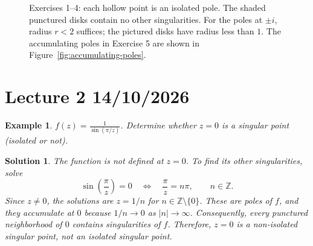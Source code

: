 \documentclass{report}
\newtheorem{example}{Example}
\newtheorem{solution}{Solution}
\begin{document}
\begin{figure}[H]
    \centering
    \caption{Exercises 1--4: each hollow point is an isolated pole. The shaded punctured disks contain no other singularities. For the poles at $\pm i$, radius $r<2$ suffices; the pictured disks have radius less than $1$. The accumulating poles in Exercise 5 are shown in Figure~\ref{fig:accumulating-poles}.}
    \label{fig:isolated-poles}
\end{figure}




\section{Lecture 2 14/10/2026}



\begin{example}
$f(z) = \frac{1}{\sin(\pi/z)}$. Determine whether $z=0$ is a singular point (isolated or not).
\end{example}
\begin{solution}
    The function is not defined at $z=0$. To find its other singularities, solve
    \[
        \sin\left(\frac{\pi}{z}\right)=0
        \quad\Longleftrightarrow\quad
        \frac{\pi}{z}=n\pi,\qquad n\in\mathbb{Z}.
    \]
    Since $z\ne 0$, the solutions are $z=1/n$ for
    $n\in\mathbb{Z}\setminus\{0\}$. These are poles of $f$, and they
    accumulate at $0$ because $1/n\to 0$ as $|n|\to\infty$.
    Consequently, every punctured neighborhood of $0$ contains singularities
    of $f$. Therefore, $z=0$ is a non-isolated singular point, not an isolated
    singular point.
\end{solution}
\end{document}
